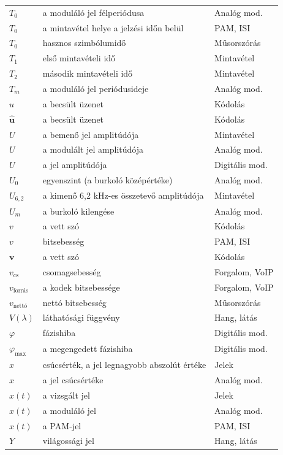 {\begin{longtable}{@{}>{\raggedright\arraybackslash}p{2.4cm}>{\raggedright\arraybackslash}p{8.2cm}>{\raggedright\arraybackslash}p{3.8cm}@{}}
$T_0$ & a moduláló jel félperiódusa & Analóg mod.\\
$T_0$ & a mintavétel helye a jelzési időn belül & PAM, ISI\\
$T_0$ & hasznos szimbólumidő & Műsorszórás\\
$T_1$ & első mintavételi idő & Mintavétel\\
$T_2$ & második mintavételi idő & Mintavétel\\
$T_m$ & a moduláló jel periódusideje & Analóg mod.\\
$\hat u$ & a becsült üzenet & Kódolás\\
$\hat{\mathbf u}$ & a becsült üzenet & Kódolás\\
$U$ & a bemenő jel amplitúdója & Mintavétel\\
$U$ & a modulált jel amplitúdója & Analóg mod.\\
$U$ & a jel amplitúdója & Digitális mod.\\
$U_0$ & egyenszint (a burkoló középértéke) & Analóg mod.\\
$U_{6{,}2}$ & a kimenő 6,2 kHz-es összetevő amplitúdója & Mintavétel\\
$U_m$ & a burkoló kilengése & Analóg mod.\\
$v$ & a vett szó & Kódolás\\
$v$ & bitsebesség & PAM, ISI\\
$\mathbf v$ & a vett szó & Kódolás\\
$v_\text{cs}$ & csomagsebesség & Forgalom, VoIP\\
$v_\text{forrás}$ & a kodek bitsebessége & Forgalom, VoIP\\
$v_\text{nettó}$ & nettó bitsebesség & Műsorszórás\\
$V(\lambda)$ & láthatósági függvény & Hang, látás\\
$\varphi$ & fázishiba & Digitális mod.\\
$\varphi_{\max}$ & a megengedett fázishiba & Digitális mod.\\
$\hat x$ & csúcsérték, a jel legnagyobb abszolút értéke & Jelek\\
$\hat x$ & a jel csúcsértéke & Analóg mod.\\
$x(t)$ & a vizsgált jel & Jelek\\
$x(t)$ & a moduláló jel & Analóg mod.\\
$x(t)$ & a PAM-jel & PAM, ISI\\
$Y$ & világossági jel & Hang, látás\\
\bottomrule\end{longtable}}












